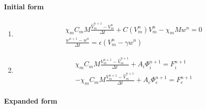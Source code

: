 \documentclass[a4paper]{article}
\begin{document}
\paragraph{Initial form}
\begin{enumerate}[label = \Roman*, align = Center]
\item 
   \begin{equation}
   \begin{gathered}
   \chi_m C_m M\frac{\hat{V}_m^{n+1} - V_m^n}{\Delta t} + C(V_m^n)V_m^n -\chi_mMw^n = 0
   \\
   \frac{w^{n+1}-w^n}{\Delta t} = \epsilon (V_m^n - \gamma w^n)
   \end{gathered}
   \end{equation}
\item 
   \begin{equation}
   \begin{gathered}
   \chi_m C_m M\frac{V_m^{n+1} - \hat{V}_m^{n+1}}{\Delta t} + A_i\Phi_i^{n+1} = F_i^{n+1} \\
   -\chi_m C_m M\frac{V_m^{n+1} - \hat{V}_m^{n+1}}{\Delta t} + A_e\Phi_e^{n+1} = F_e^{n+1}
   \end{gathered}
   \end{equation}
\end{enumerate}
\vspace{3mm}
\paragraph{Expanded form}
\end{document}
